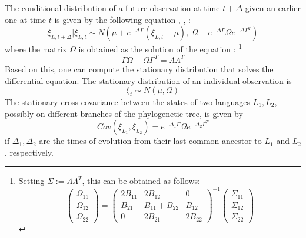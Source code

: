 \documentclass[11pt,a4paper]{article}
\begin{document}
The conditional distribution of a future observation at time $t+\Delta$ given an earlier one at time $t$ is given by the following equation \citep[Theorem 3.3]{schach1971weak}, \citep{gardiner1983handbook}, \citep[p. 156, eq. 6.124]{risken1989fokker}:
\begin{equation}
\xi_{L,t+\Delta} | \xi_{L,t} \sim N\left(\mu + e^{-\Delta \Gamma} (\xi_{L,t}-\mu),\ \Omega - e^{-\Delta \Gamma} \Omega e^{-\Delta \Gamma^T}\right)
\end{equation}
where the matrix $\Omega$ is obtained as the solution of the equation \citep[p. 110, eq. 4.4.51]{gardiner1983handbook} \citep[p. 156, eq. 6.126]{risken1989fokker}:
\footnote{Setting $\Sigma := \Lambda\Lambda^T$, this can be obtained as follows:
\begin{equation}
\left(\begin{matrix} \Omega_{11} \\ \Omega_{12} \\ \Omega_{22} \end{matrix}\right)=    \left(\begin{matrix}
    2B_{11} & 2B_{12} & 0 \\
    B_{21} & B_{11}+B_{22} & B_{12} \\
    0 & 2B_{21} & 2B_{22}
    \end{matrix}\right)^{-1}  \left(\begin{matrix} \Sigma_{11} \\ \Sigma_{12} \\ \Sigma_{22} \end{matrix}\right)
\end{equation}
}
\begin{equation}
    \Gamma\Omega+\Omega\Gamma^T = \Lambda \Lambda^T
\end{equation}
Based on this, one can compute the stationary distribution that solves the differential equation.
The stationary distribution of an individual observation is
\begin{equation}\label{eq:ornuhl-var}
\xi_{t} \sim N\left(\mu, \Omega \right)
\end{equation}
The stationary cross-covariance between the states of two languages $L_1, L_2$, possibly on different branches of the phylogenetic tree, is given by
\begin{equation}\label{eq:ornuhl-covar}
Cov(\xi_{L_1}, \xi_{L_2}) = e^{-\Delta_1 \Gamma} \Omega e^{-\Delta_2 \Gamma^T}
\end{equation}
if $\Delta_1, \Delta_2$ are the times of evolution from their last common ancestor to $L_1$ and $L_2$, respectively.
\end{document}
